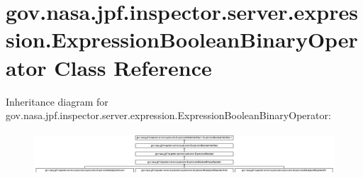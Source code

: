 \hypertarget{classgov_1_1nasa_1_1jpf_1_1inspector_1_1server_1_1expression_1_1_expression_boolean_binary_operator}{}\section{gov.\+nasa.\+jpf.\+inspector.\+server.\+expression.\+Expression\+Boolean\+Binary\+Operator Class Reference}
\label{classgov_1_1nasa_1_1jpf_1_1inspector_1_1server_1_1expression_1_1_expression_boolean_binary_operator}
Inheritance diagram for gov.\+nasa.\+jpf.\+inspector.\+server.\+expression.\+Expression\+Boolean\+Binary\+Operator\+:\begin{figure}[H]
\begin{center}
\leavevmode
\includegraphics[height=1.609195cm]{classgov_1_1nasa_1_1jpf_1_1inspector_1_1server_1_1expression_1_1_expression_boolean_binary_operator}
\end{center}
\end{figure}
